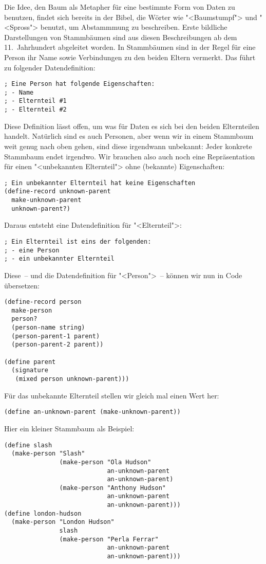 %
Die Idee, den Baum als Metapher für eine bestimmte Form von Daten zu
benutzen, findet sich bereits in der Bibel, die Wörter wie
"<Baumstumpf"> und "<Spross"> benutzt, um Abstammmung zu beschreiben.
Erste bildliche Darstellungen von Stammbäumen sind aus diesen
Beschreibungen ab dem 11.\ Jahrhundert abgeleitet worden.
In Stammbäumen sind in der Regel für eine Person ihr Name sowie
Verbindungen zu den beiden Eltern vermerkt.  Das führt zu folgender
Datendefinition:
%
\begin{lstlisting}
; Eine Person hat folgende Eigenschaften:
; - Name
; - Elternteil #1
; - Elternteil #2
\end{lstlisting}
%
Diese Definition lässt offen, um was für Daten es sich bei den beiden
Elternteilen handelt.  Natürlich sind es auch Personen, aber wenn wir
in einem Stammbaum weit genug nach oben gehen, sind diese irgendwann
unbekannt: Jeder konkrete Stammbaum endet irgendwo.  Wir brauchen also
auch noch eine Repräsentation für einen "<unbekannten Elternteil">
ohne (bekannte) Eigenschaften:
%
\begin{lstlisting}
; Ein unbekannter Elternteil hat keine Eigenschaften
(define-record unknown-parent
  make-unknown-parent
  unknown-parent?)
\end{lstlisting}
%
Daraus entsteht eine Datendefinition für "<Elternteil">:
%
\begin{lstlisting}
; Ein Elternteil ist eins der folgenden:
; - eine Person
; - ein unbekannter Elternteil
\end{lstlisting}
%
Diese~-- und die Datendefinition für "<Person">~-- können wir nun in Code
übersetzen:
%
\begin{lstlisting}
(define-record person
  make-person
  person?
  (person-name string)
  (person-parent-1 parent)
  (person-parent-2 parent))

(define parent
  (signature
   (mixed person unknown-parent)))
\end{lstlisting}
%
Für das unbekannte Elternteil stellen wir gleich mal einen Wert her:
%
\begin{lstlisting}
(define an-unknown-parent (make-unknown-parent))
\end{lstlisting}
%
Hier ein kleiner Stammbaum als Beispiel:
%
\begin{lstlisting}
(define slash
  (make-person "Slash"
               (make-person "Ola Hudson"
                            an-unknown-parent
                            an-unknown-parent)
               (make-person "Anthony Hudson"
                            an-unknown-parent
                            an-unknown-parent)))
(define london-hudson
  (make-person "London Hudson"
               slash
               (make-person "Perla Ferrar"
                            an-unknown-parent
                            an-unknown-parent)))
\end{lstlisting}
